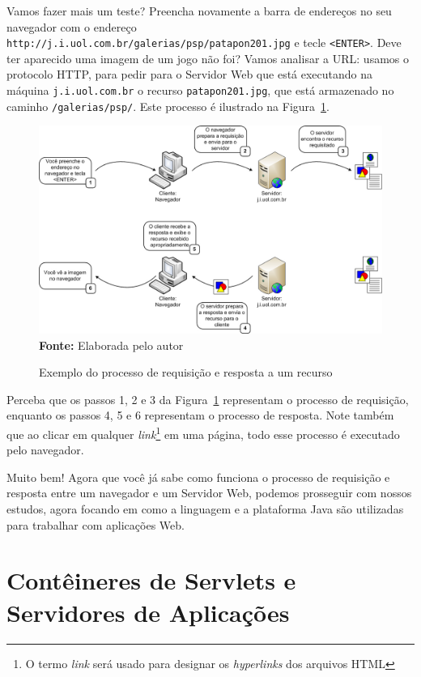Vamos fazer mais um teste? Preencha novamente a barra de endereços no seu navegador com o endereço \texttt{http://j.i.uol.com.br/galerias/psp/patapon201.jpg} e tecle \texttt{<ENTER>}. Deve ter aparecido uma imagem de um jogo não foi? Vamos analisar a URL: usamos o protocolo HTTP, para pedir para o Servidor Web que está executando na máquina \texttt{j.i.uol.com.br} o recurso \texttt{patapon201.jpg}, que está armazenado no caminho \texttt{/galerias/psp/}. Este processo é ilustrado na Figura~\ref{fig:cap01ExemploRequestResponse}.

\FloatBarrier
\begin{figure}[!htbp]
    \centering
    \caption{Exemplo do processo de requisição e resposta a um recurso}
    \includegraphics[scale=0.38]{imagens/cap01ExemploRequestResponse}
    \\\textbf{Fonte:} Elaborada pelo autor
    \label{fig:cap01ExemploRequestResponse}
\end{figure}
\FloatBarrier

Perceba que os passos 1, 2 e 3 da Figura~\ref{fig:cap01ExemploRequestResponse} representam o processo de requisição, enquanto os passos 4, 5 e 6 representam o processo de resposta. Note também que ao clicar em qualquer \textit{link}\footnote{O termo \textit{link} será usado para designar os \textit{hyperlinks} dos arquivos HTML} em uma página, todo esse processo é executado pelo navegador.

Muito bem! Agora que você já sabe como funciona o processo de requisição e resposta entre um navegador e um Servidor Web, podemos prosseguir com nossos estudos, agora focando em como a linguagem e a plataforma Java são utilizadas para trabalhar com aplicações Web.


\section{Contêineres de Servlets e Servidores de Aplicações}

